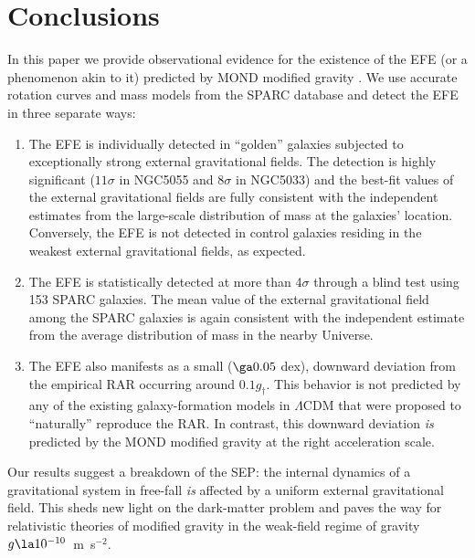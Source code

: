 \documentclass[twocolumn,tighten]{aastex63}
\begin{document}
\section{Conclusions}  \label{sec:conc}

In this paper we provide observational evidence for the existence of the EFE (or a phenomenon akin to it) predicted by MOND modified gravity \citep{BM84}. We use accurate rotation curves and mass models from the SPARC database \citep{Lel16} and detect the EFE in three separate ways:
\begin{enumerate}


\item The EFE is individually detected in ``golden'' galaxies subjected to exceptionally strong external gravitational fields. The detection is highly significant ($11\sigma$ in NGC5055 and $8\sigma$ in NGC5033) and the best-fit values of the external gravitational fields are fully consistent with the independent estimates from the large-scale distribution of mass at the galaxies' location. Conversely, the EFE is not detected in control galaxies residing in the weakest external gravitational fields, as expected.


\item The EFE is statistically detected at more than 4$\sigma$ through a blind test using 153 SPARC galaxies. The mean value of the external gravitational field among the SPARC galaxies is again consistent with the independent estimate from the average distribution of mass in the nearby Universe.

\item The EFE also manifests as a small ($\ga 0.05$ dex), downward deviation from the empirical RAR occurring around $0.1 g_\dagger$. This behavior is not predicted by any of the existing galaxy-formation models in $\Lambda$CDM that were proposed to ``naturally'' reproduce the RAR. In contrast, this downward deviation \emph{is} predicted by the MOND modified gravity at the right acceleration scale.
  
\end{enumerate}


Our results suggest a breakdown of the SEP: the internal dynamics of a gravitational system in free-fall \textit{is} affected by a uniform external gravitational field. This sheds new light on the dark-matter problem and paves the way for relativistic theories of modified gravity in the weak-field regime of gravity $g \la 10^{-10}$~m~s$^{-2}$.


\vspace{0.3in}
\end{document}
